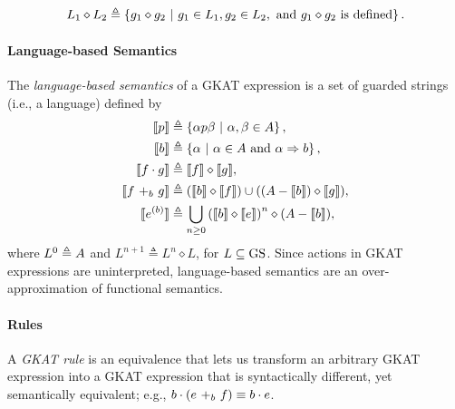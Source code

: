 \begin{align*}
    L_1\diamond L_2 \triangleq \set{g_1\diamond g_2\ |\ g_1\in L_1,g_2\in L_2,\text{ and $g_1\diamond g_2$ is defined}}.
\end{align*}
\paragraph*{Language-based Semantics}
The \emph{language-based semantics} of a GKAT expression is a {set of guarded strings} (i.e., a language) defined by%
\begin{align*}
\semantics{p} &\triangleq \set{\alpha p \beta\ |\ \alpha,\beta\in \Atom},\\
%
\semantics{b} &\triangleq  \set{\alpha\ |\ \alpha\in \Atom \text{ and }\alpha \Rightarrow b},\\
%
\semantics{f\cdot g} &\triangleq \semantics{f}\diamond\semantics{g},\\
%
%
\semantics{\branch{b}{f}{g}} &\triangleq (\semantics{b}\diamond\semantics{f})\cup ((\Atom-\semantics{b})\diamond \semantics{g}),\\
%
%
\semantics{ \iteration{b}{e}} &\triangleq  \bigcup_{n\geq 0}\left(\semantics{b}\diamond\semantics{e}\right)^{n}\diamond (\Atom-\semantics{b}),
%
%
\end{align*}
where $L^0\triangleq\Atom$ and $L^{n+1}\triangleq L^{n} \diamond L$, for $L \subseteq \GuardedString$. Since actions in GKAT expressions are uninterpreted, language-based semantics are an over-approximation of functional semantics. %
\paragraph*{Rules}
A \emph{GKAT rule} is an equivalence that lets us transform an arbitrary GKAT expression into a GKAT expression that is syntactically different, yet semantically equivalent; e.g., $b\cdot\left(\branch{b}{e}{f} \right) \equiv b\cdot e$.

